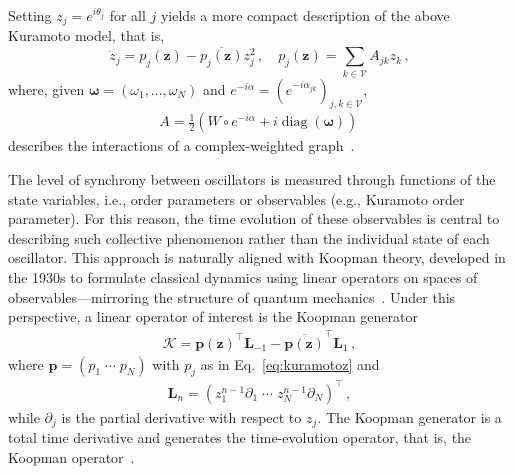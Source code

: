\documentclass[aps,pre,reprint,longbibliography,superscriptaddress,noshowpacs,floatfix]{revtex4-2}
\theoremstyle{definition}
\theoremstyle{remark}
\DeclareMathOperator{\diag}{diag}
\begin{document}
Setting $z_j = e^{i\theta_j}$ for all $j$ yields a more compact description of the above Kuramoto model, that is,
\begin{equation}\label{eq:kuramotoz}
    \dot{z}_j = p_j(\bm{z}) - \overline{p_j(\bm{z})}z_j^2\,,\quad p_j(\bm{z}) = \sum_{k \in\mathcal{V}} A_{jk}z_k\,,%
\end{equation}
where, given $\bm{\omega} = (\omega_1,...,\omega_N)$ and $e^{-i\alpha} = (e^{-i\alpha_{jk}})_{j,k\in\mathcal{V}}$,
\begin{align}\label{eq:complex_matrix}
     A = \frac{1}{2}\left( W \circ e^{-i\alpha} + i\diag(\bm{\omega})\right)\,
\end{align}
describes the interactions of a complex-weighted graph~\cite{Bottcher2024}.

The level of synchrony between oscillators is measured through functions of the state variables, i.e., order parameters or observables (e.g., Kuramoto order parameter). For this reason, the time evolution of these observables is central to describing such collective phenomenon rather than the individual state of each oscillator. This approach is naturally aligned with Koopman theory, developed in the 1930s to formulate classical dynamics using linear operators on spaces of
observables---mirroring the structure of quantum mechanics~\cite{Koopman1931,Koopman1932, VonNeumann1932, Carleman1932, Budisic2012, Joseph2020, Brunton2022}. Under this perspective, a linear operator of interest is the Koopman generator
\begin{align}\label{eq:kooku}
    \mathcal{K} = \bm{p}(\bm{z})^\top \bm{L}_{-1} 
 - \overline{\bm{p}(\bm{z})}^\top \bm{L}_1\,, %
\end{align}
where $\bm{p} = (p_1\;\cdots\;p_N)$ with $p_j$ as in Eq.~\eqref{eq:kuramotoz} and 
\begin{align*}
    \bm{L}_{n} = (z_1^{n-1}\partial_1\;\cdots\;z_N^{n-1}\partial_N)^\top\,,
\end{align*} %
while $\partial_j$ is the partial derivative with respect to $z_j$. The Koopman generator is a total time derivative and generates the time-evolution operator, that is, the Koopman operator~\cite{Budisic2012, Joseph2020, Brunton2022}. 
\end{document}
